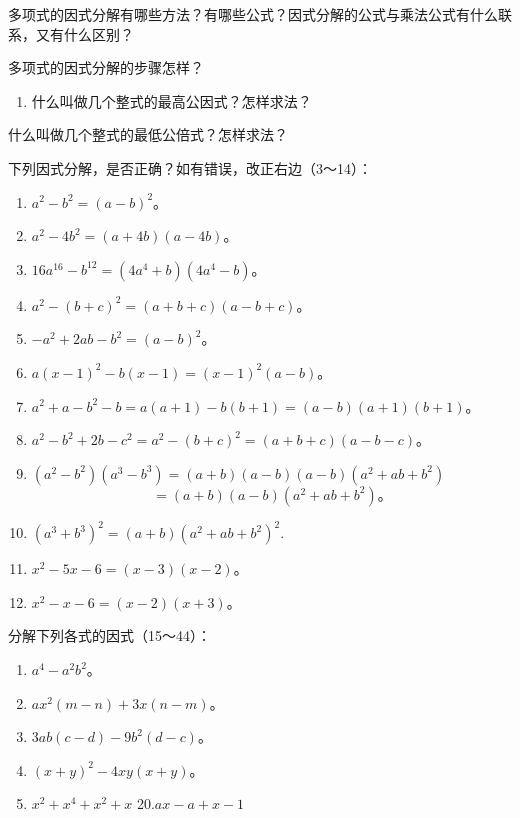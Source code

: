 多项式的因式分解有哪些方法？有哪些公式？因式分解的公式与乘法公式有什么联系，又有什么区别？

多项式的因式分解的步骤怎样？

\begin{enumerate}[start=2]
\item
  什么叫做几个整式的最高公因式？怎样求法？
\end{enumerate}

什么叫做几个整式的最低公倍式？怎样求法？

下列因式分解，是否正确？如有错误，改正右边（3～14）：

\begin{enumerate}[start=3]
\item
  \(a^2 - b^2 = (a - b)^2\)。
\item
  \(a^2 - 4b^2 = (a + 4b)(a - 4b)\)。
\item
  \(16a^{16} - b^{12} = (4a^4 + b)(4a^4 - b)\)。
\item
  \(a^2 - (b + c)^2 = (a + b + c)(a - b + c)\)。
\item
  \(-a^{2} + 2ab - b^{2} = (a - b)^{2}\)。
\item
  \(a(x - 1)^{2} - b(x - 1) = (x - 1)^{2}(a - b)\)。
\item
  \(a^2 + a - b^2 - b = a(a + 1) - b(b + 1) = (a - b)(a + 1)(b + 1)\)。
\item
  \(a^2 - b^2 + 2b - c^2 = a^2 - (b + c)^2 = (a + b + c)(a - b - c)\)。
\item
  \((a^2 - b^2)(a^3 - b^3) = (a + b)(a - b)(a - b)(a^2 + ab + b^2)\)
\[
= (a + b) (a - b) \left(a ^{2} + a b + b ^{2}\right)\text{。}
\]
\item
  \((a^3 + b^3)^2 = (a + b)(a^2 + ab + b^2)^2.\)
\item
  \(x^{2} - 5x - 6 = (x - 3)(x - 2)\)。
\item
  \(x^{2} - x - 6 = (x - 2)(x + 3)\)。
\end{enumerate}

分解下列各式的因式（15～44）：

\begin{enumerate}[start=15]
\item
  \(a^4 - a^2 b^2\)。
\item
  \(ax^2(m - n) + 3x(n - m)\)。
\item
  \(3ab(c - d) - 9b^{2}(d - c)\)。
\item
  \((x + y)^{2} - 4xy(x + y)\)。
\item
  \(x^{2} + x^{4} + x^{2} + x\) 20.\(ax - a + x - 1\)
\end{enumerate}

